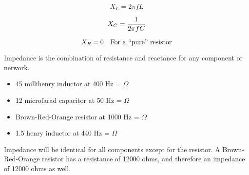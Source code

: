 $$X_L = 2 \pi f L$$

$$X_C = {1 \over 2 \pi f C}$$

$$X_R = 0 \hskip 10pt \hbox{For a ``pure'' resistor}$$

Impedance is the combination of resistance and reactance for any component or network.







\begin{itemize}
\item{} 45 millihenry inductor at 400 Hz =  $\Omega$
\vskip 10pt
\item{} 12 microfarad capacitor at 50 Hz =  $\Omega$
\vskip 10pt
\item{} Brown-Red-Orange resistor at 1000 Hz =  $\Omega$
\vskip 10pt
\item{} 1.5 henry inductor at 440 Hz =  $\Omega$
\end{itemize}

Impedance will be identical for all components except for the resistor.  A Brown-Red-Orange resistor has a resistance of 12000 ohms, and therefore an impedance of 12000 ohms as well.





